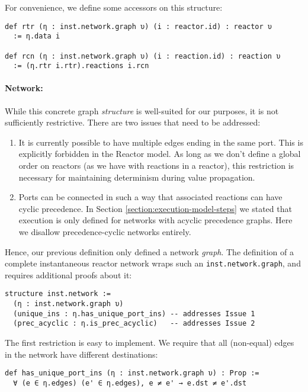 \noindent For convenience, we define some accessors on this structure:

\begin{lstlisting}
def rtr (η : inst.network.graph υ) (i : reactor.id) : reactor υ 
  := η.data i

def rcn (η : inst.network.graph υ) (i : reaction.id) : reaction υ 
  := (η.rtr i.rtr).reactions i.rcn
\end{lstlisting}

\paragraph{Network:}

While this concrete graph \emph{structure} is well-suited for our purposes, it is not sufficiently restrictive.
There are two issues that need to be addressed:

\begin{enumerate}
  \item It is currently possible to have multiple edges ending in the same port.
  This is explicitly forbidden in the Reactor model.
  As long as we don't define a global order on reactors (as we have with reactions in a reactor), this restriction is necessary for maintaining determinism during value propagation.
  \item Ports can be connected in such a way that associated reactions can have cyclic precedence.
  In Section \ref{section:execution-model-steps} we stated that execution is only defined for networks with acyclic precedence graphs.
  Here we disallow precedence-cyclic networks entirely.
\end{enumerate}

\noindent Hence, our previous definition only defined a network \emph{graph}.
The definition of a complete instantaneous reactor network wraps such an \lstinline{inst.network.graph}, and requires additional proofs about it:

\begin{lstlisting}
structure inst.network :=
  (η : inst.network.graph υ)
  (unique_ins : η.has_unique_port_ins) -- addresses Issue 1
  (prec_acyclic : η.is_prec_acyclic)   -- addresses Issue 2
\end{lstlisting}

\noindent The first restriction is easy to implement.
We require that all (non-equal) edges in the network have different destinations:

\begin{lstlisting}
def has_unique_port_ins (η : inst.network.graph υ) : Prop :=
  ∀ (e ∈ η.edges) (e' ∈ η.edges), e ≠ e' → e.dst ≠ e'.dst
\end{lstlisting}

